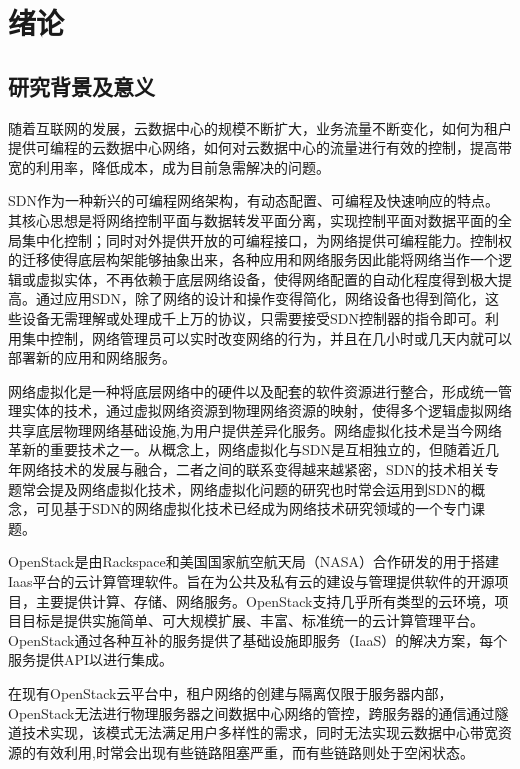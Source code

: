 
\chapter{绪论}
\section{研究背景及意义}
随着互联网的发展，云数据中心的规模不断扩大，业务流量不断变化，如何为租户提供可编程的云数据中心网络，如何对云数据中心的流量进行有效的控制，提高带宽的利用率，降低成本，成为目前急需解决的问题。

\gls*{SDN}作为一种新兴的可编程网络架构，有动态配置、可编程及快速响应的特点。其核心思想是将网络控制平面与数据转发平面分离，实现控制平面对数据平面的全局集中化控制；同时对外提供开放的可编程接口，为网络提供可编程能力。控制权的迁移使得底层构架能够抽象出来，各种应用和网络服务因此能将网络当作一个逻辑或虚拟实体，不再依赖于底层网络设备\cite{SDN-1}，使得网络配置的自动化程度得到极大提高。通过应用\gls*{SDN}，除了网络的设计和操作变得简化，网络设备也得到简化，这些设备无需理解或处理成千上万的协议，只需要接受\gls*{SDN}控制器的指令即可。利用集中控制，网络管理员可以实时改变网络的行为，并且在几小时或几天内就可以部署新的应用和网络服务。

网络虚拟化\cite{Virtual-1}是一种将底层网络中的硬件以及配套的软件资源进行整合，形成统一管理实体的技术，通过虚拟网络资源到物理网络资源的映射，使得多个逻辑虚拟网络共享底层物理网络基础设施,为用户提供差异化服务。网络虚拟化技术是当今网络革新的重要技术之一。从概念上，网络虚拟化与\gls*{SDN}是互相独立的，但随着近几年网络技术的发展与融合，二者之间的联系变得越来越紧密，\gls*{SDN}的技术相关专题常会提及网络虚拟化技术，网络虚拟化问题的研究也时常会运用到\gls*{SDN}的概念，可见基于\gls*{SDN}的网络虚拟化技术已经成为网络技术研究领域的一个专门课题。

OpenStack\cite{Openstack-1}是由Rackspace和美国国家航空航天局（NASA）合作研发的用于搭建Iaas平台的云计算管理软件。旨在为公共及私有云的建设与管理提供软件的开源项目，主要提供计算、存储、网络服务。OpenStack支持几乎所有类型的云环境，项目目标是提供实施简单、可大规模扩展、丰富、标准统一的云计算管理平台。OpenStack通过各种互补的服务提供了基础设施即服务（IaaS）的解决方案，每个服务提供API以进行集成\cite{Openstack-2}。

在现有OpenStack云平台中，租户网络的创建与隔离仅限于服务器内部，OpenStack无法进行物理服务器之间数据中心网络的管控，跨服务器的通信通过隧道技术实现，该模式无法满足用户多样性的需求，同时无法实现云数据中心带宽资源的有效利用,时常会出现有些链路阻塞严重，而有些链路则处于空闲状态。

